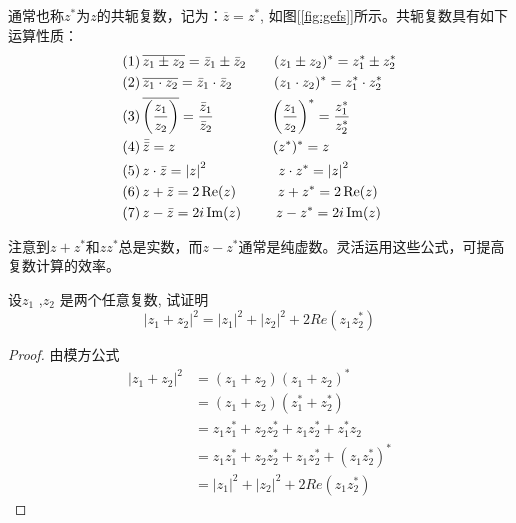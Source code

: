 通常也称$z^*$为$z$的共轭复数，记为：$\overline{z} = z^*$, 如图[\ref{fig:gefs}]所示。共轭复数具有如下运算性质：
\begin{equation}\label{}
    \begin{aligned}
    &(1) \, \overline{z_{1} \pm z_{2}}=\bar{z}_{1} \pm \bar{z}_{2} \qquad  (z_{1} \pm z_{2})^* = z_{1}^* \pm z_{2}^* \\
    &(2) \, \overline{z_{1} \cdot z_{2}}=\bar{z}_{1} \cdot \bar{z}_{2}  \hspace{1em} \qquad (z_{1} \cdot z_{2})^* = z_{1}^* \cdot z_{2}^* \\
    &(3) \, \overline{\left(\frac{z_{1}}{z_{2}}\right)}=\frac{\bar{z}_{1}}{\bar{z}_{2}}  \hspace{2em} \qquad \left(\frac{z_{1}}{z_{2}}\right)^* = \frac{z_{1}^*}{z_{2}^*}\\
    &(4) \,\bar{\bar{z}}=z \hspace{5em} \qquad  (z^*)^* = z \\
    &(5) \,z \cdot \bar{z}=\left\vert z\right\vert^2 \hspace{3em} \qquad  z \cdot z^* = \left\vert z\right\vert^2 \\
    &(6) \,z+\bar{z}=2 \operatorname{Re}(z)  \hspace{1em} \qquad  z+z^*=2 \operatorname{Re}(z)  \\
    &(7) \,z-\bar{z}=2 i \operatorname{Im}(z)  \hspace{0.5em} \qquad z-z^*=2 i \operatorname{Im}(z) \\ 
\end{aligned} 
\end{equation}

注意到$z+z^*$和$zz^*$总是实数，而$z-z^*$通常是纯虚数。灵活运用这些公式，可提高复数计算的效率。
\begin{example}
    设$z_1 $ ,$ z_2 $ 是两个任意复数, 试证明 
	\[ \left\vert z_1 + z_2\right\vert ^2 =  \left\vert z_1\right\vert^2 + \left\vert z_2\right\vert^2  + 2 Re(z_1z_2^*)\] 
\end{example}
\begin{proof}
    由模方公式 
	\[ \begin{aligned}
		\left\vert z_1 + z_2\right\vert ^2  &= (z_1 + z_2)(z_1 + z_2)^* \\ 
		&= (z_1 + z_2)(z_1^* + z_2^* ) \\
		&= z_1 z_1^* + z_2 z_2^*  + z_1 z_2^* + z_1^* z_2  \\
		&= z_1 z_1^* + z_2 z_2^* + z_1 z_2^* + (z_1 z_2^*)^*  \\
		&= \left\vert z_1 \right\vert^2 + \left\vert z_2 \right\vert^2 + 2 Re(z_1z_2^*)
	\end{aligned}\]
\end{proof}

